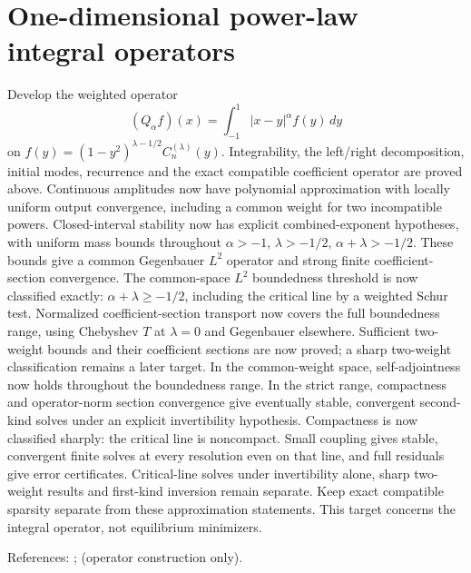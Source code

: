 \section{One-dimensional power-law integral operators}\label{thm:power-law-1d-operator}
Develop the weighted operator
\[
 (Q_\alpha f)(x)=\int_{-1}^1 |x-y|^\alpha f(y)\,dy
\]
on $f(y)=(1-y^2)^{\lambda-1/2}C_n^{(\lambda)}(y)$.
Integrability, the left/right decomposition, initial modes, recurrence and the
exact compatible coefficient operator are proved above. Continuous amplitudes now
have polynomial approximation with locally uniform output convergence, including
a common weight for two incompatible powers. Closed-interval stability now has
explicit combined-exponent hypotheses, with uniform mass bounds throughout
$\alpha>-1$, $\lambda>-1/2$, $\alpha+\lambda>-1/2$. These bounds give a common
Gegenbauer $L^2$ operator and strong finite coefficient-section convergence.
The common-space $L^2$ boundedness threshold is now classified exactly:
$\alpha+\lambda\ge-1/2$, including the critical line by a weighted Schur test.
Normalized coefficient-section transport now covers the full boundedness range,
using Chebyshev $T$ at $\lambda=0$ and Gegenbauer elsewhere. Sufficient two-weight bounds and their coefficient sections are now proved;
a sharp two-weight classification remains a later target. In the common-weight
space, self-adjointness now holds throughout the boundedness range. In the
strict range, compactness and operator-norm section convergence give eventually
stable, convergent second-kind solves under an explicit invertibility hypothesis.
Compactness is now classified sharply: the critical line is noncompact.
Small coupling gives stable, convergent finite solves at every resolution even
on that line, and full residuals give error certificates. Critical-line solves
under invertibility alone, sharp two-weight results and first-kind inversion
remain separate. Keep exact compatible
sparsity separate from these approximation statements.
This target concerns the integral operator, not equilibrium minimizers.

References: \cite[Section 2]{gutleb-carrillo-olver};
\cite[Sections 3.4--3.5]{gutleb-thesis} (operator construction only).
